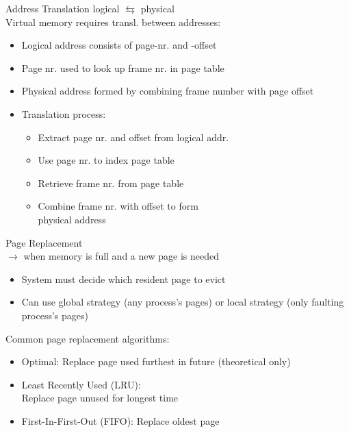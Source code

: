 \multend


\begin{concept}{Address Translation} logical $\leftrightarrows$ physical\\
    Virtual memory requires transl. between addresses:
    \begin{itemize}
        \item Logical address consists of page-nr. and -offset
        \item Page nr. used to look up frame nr. in page table
        \item Physical address formed by combining frame number with page offset
        \item Translation process:
            \begin{itemize}
                \item Extract page nr. and offset from logical addr.
                \item Use page nr. to index page table
                \item Retrieve frame nr. from page table
                \item Combine frame nr. with offset to form \\ physical address
            \end{itemize}
    \end{itemize}
\end{concept}

\begin{concept}{Page Replacement}\\
    $\rightarrow$ when memory is full and a new page is needed
    \begin{itemize}
        \item System must decide which resident page to evict
        \item Can use global strategy (any process's pages) or local strategy (only faulting process's pages)
    \end{itemize}
        Common page replacement algorithms:
            \begin{itemize}
                \item Optimal: Replace page used furthest in future (theoretical only)
                \item Least Recently Used (LRU): \\ Replace page unused for longest time
                \item First-In-First-Out (FIFO): Replace oldest page
            \end{itemize}
\end{concept}

